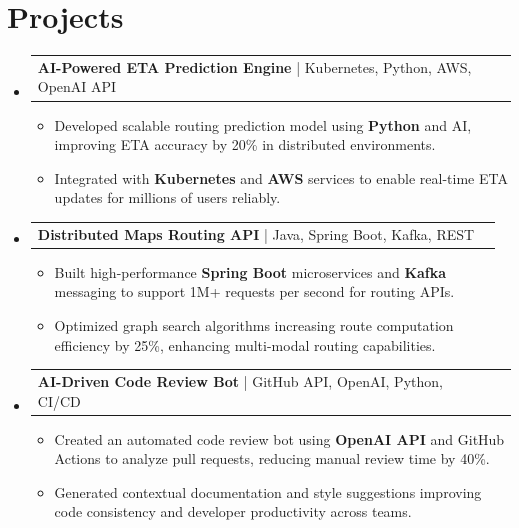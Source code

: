 \documentclass[letterpaper,11pt]{article}
\makeatletter
\newcommand{\resumeItem}[1]{
  \item\footnotesize{
    {#1 \vspace{-2pt}}
  }
}
\newcommand{\resumeProjectHeading}[2]{
    \item
    \begin{tabular*}{1.001\textwidth}{l@{\extracolsep{\fill}}r}
      \small#1 & \textbf{\small #2}\\
    \end{tabular*}\vspace{-7pt}
}
\newcommand{\resumeSubHeadingListStart}{\begin{itemize}[leftmargin=0pt, label={}]}
\newcommand{\resumeSubHeadingListEnd}{\end{itemize}}
\newcommand{\resumeItemListStart}{\begin{itemize}[leftmargin=*]}
\newcommand{\resumeItemListEnd}{\end{itemize}\vspace{-5pt}}
\makeatother
\begin{document}
\section{Projects}
    \vspace{-5pt}
    \resumeSubHeadingListStart
      \resumeProjectHeading
          {\textbf{AI-Powered ETA Prediction Engine} | Kubernetes, Python, AWS, OpenAI API}{}
          \resumeItemListStart
              \resumeItem{Developed scalable routing prediction model using \textbf{Python} and AI, improving ETA accuracy by 20\% in distributed environments.}
              \resumeItem{Integrated with \textbf{Kubernetes} and \textbf{AWS} services to enable real-time ETA updates for millions of users reliably.}
          \resumeItemListEnd
          \vspace{-12pt}
      \resumeProjectHeading
          {\textbf{Distributed Maps Routing API} | Java, Spring Boot, Kafka, REST}{}
          \resumeItemListStart
              \resumeItem{Built high-performance \textbf{Spring Boot} microservices and \textbf{Kafka} messaging to support 1M+ requests per second for routing APIs.}
              \resumeItem{Optimized graph search algorithms increasing route computation efficiency by 25\%, enhancing multi-modal routing capabilities.}
          \resumeItemListEnd
          \vspace{-12pt}
      \resumeProjectHeading
          {\textbf{AI-Driven Code Review Bot} | GitHub API, OpenAI, Python, CI/CD}{}
          \resumeItemListStart
              \resumeItem{Created an automated code review bot using \textbf{OpenAI API} and GitHub Actions to analyze pull requests, reducing manual review time by 40\%.}
              \resumeItem{Generated contextual documentation and style suggestions improving code consistency and developer productivity across teams.}
          \resumeItemListEnd
    \resumeSubHeadingListEnd
\end{document}
